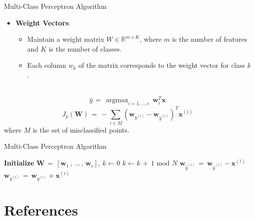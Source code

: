 \documentclass[serif, aspectratio=169]{beamer}
\DeclareMathOperator*{\argmax}{argmax}
\begin{document}
\begin{frame}{Multi-Class Perceptron Algorithm}
    \begin{itemize}
        \item \textbf{Weight Vectors}:
        \medskip
        \begin{itemize}\itemsep.8em
            \item Maintain a weight matrix \( W \in \mathbb{R}^{m \times K} \), where \( m \) is the number of features and \( K \) is the number of classes.
        \item Each column \( w_k \) of the matrix corresponds to the weight vector for class \( k \).
        \end{itemize}
    \end{itemize} \\
    \[
    \hat{y} \, = \, \argmax_{i=1,...,c} \, \mathbf{w}_i^T \mathbf{x}
    \]
    \[
    J_p(\mathbf{W}) \, = \, - \sum_{i \in M}(\mathbf{w}_{y^{(i)}} - \mathbf{w}_{\hat{y}^{(i)}})^T\mathbf{x}^{(i)}
    \]
    where \( M \) is the set of misclassified points.
\end{frame}


\begin{frame}{Multi-Class Perceptron Algorithm}

    \begin{algorithm}[H]
    \caption{Multi-class perceptron}\label{alg:Multi-class perceptron}
    \begin{algorithmic}[1]
        \State \textbf{Initialize} $\mathbf{W} \, = \, [\mathbf{w}_1 \, , \, ... \, , \, \mathbf{w}_c], \, k \leftarrow 0$
            \State \(k \leftarrow k \, + \, 1 \text{ mod } N\)
            \State \(\mathbf{w}_{\hat{y}^{(i)}} \, = \, \mathbf{w}_{\hat{y}^{(i)}} - \mathbf{x}^{(i)}\)
            \State \(\mathbf{w}_{y^{(i)}} \, = \, \mathbf{w}_{y^{(i)}} + \mathbf{x}^{(i)}\)
            \EndIf
        \EndWhile
    \end{algorithmic}
    \end{algorithm}
    
\end{frame}


\section{References}

\begin{frame}[allowframebreaks]
    
    
    \nocite{*} %
\end{frame}
\end{document}

